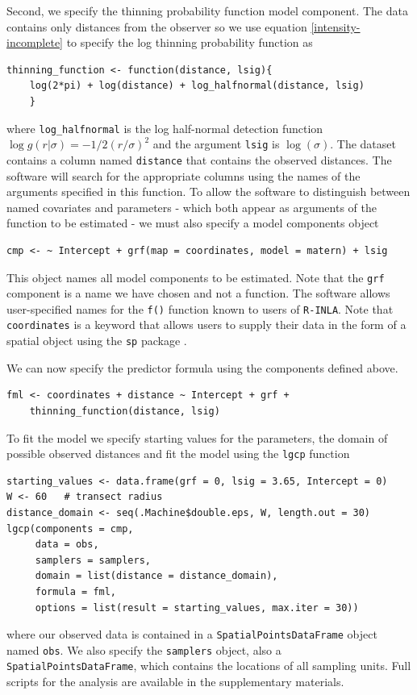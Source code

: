 \documentclass[preprint,12pt]{elsarticle}
\begin{document}
Second, we specify the thinning probability function model component.  The data contains only distances from the observer so we use equation \eqref{intensity-incomplete} to specify the log thinning probability function as
\begin{lstlisting}
thinning_function <- function(distance, lsig){
    log(2*pi) + log(distance) + log_halfnormal(distance, lsig)
    }
\end{lstlisting}
where \texttt{log\_halfnormal} is the log half-normal detection function $\log g(r | \sigma) = -1/2(r/\sigma)^2$ and the argument \texttt{lsig} is $\log(\sigma)$.  The dataset contains a column named \texttt{distance} that contains the observed distances.  The software will search for the appropriate columns using the names of the arguments specified in this function.  To allow the software to distinguish between named covariates and parameters - which both appear as arguments of the function to be estimated - we must also specify a model components object
\begin{lstlisting}
cmp <- ~ Intercept + grf(map = coordinates, model = matern) + lsig 
\end{lstlisting} 
This object names all model components to be estimated.  Note that the \texttt{grf} component is a name we have chosen and not a function.  The software allows user-specified names for the \texttt{f()} function known to users of \texttt{R-INLA}. Note that \texttt{coordinates} is a keyword that allows users to supply their data in the form of a spatial object using the \texttt{sp} package \citep{pebesma_spatial_2005}.  

We can now specify the predictor formula using the components defined above.  
\begin{lstlisting}
fml <- coordinates + distance ~ Intercept + grf +
	thinning_function(distance, lsig)
\end{lstlisting}
To fit the model we specify starting values for the parameters, the domain of possible observed distances and fit the model using the \texttt{lgcp} function
\begin{lstlisting}
starting_values <- data.frame(grf = 0, lsig = 3.65, Intercept = 0)
W <- 60   # transect radius
distance_domain <- seq(.Machine$double.eps, W, length.out = 30)
lgcp(components = cmp, 
     data = obs,
     samplers = samplers,
     domain = list(distance = distance_domain),
     formula = fml,
     options = list(result = starting_values, max.iter = 30))
\end{lstlisting}
where our observed data is contained in a \texttt{SpatialPointsDataFrame} object named \texttt{obs}.  We also specify the \texttt{samplers} object, also a \texttt{SpatialPointsDataFrame}, which contains the locations of all sampling units.  Full scripts for the analysis are available in the supplementary materials.
\end{document}
